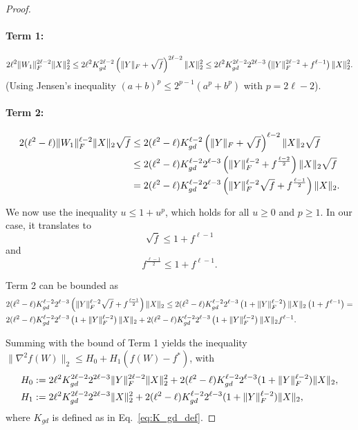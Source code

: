\documentclass[a4paper,11pt]{article}
\DeclarePairedDelimiter{\norm}{\|}{\|}
\newcommand{\1}{\mathbbm{1}}
\theoremstyle{plain}
\begin{document}
\begin{proof}
\paragraph{Term 1:}
\begin{align*}
2\ell^2 \norm{W_1}_F^{2\ell-2} \norm{X}_2^2
\le 2\ell^2 K_{gd}^{2\ell-2} \left( \norm{Y}_F + \sqrt{f} \right)^{2\ell-2} \norm{X}_2^2 
\le 2\ell^2 K_{gd}^{2\ell-2} 2^{2\ell-3} \left( \norm{Y}_F^{2\ell-2} + f^{\ell-1} \right) \norm{X}_2^2.
\end{align*}
(Using Jensen's inequality $(a+b)^p \le 2^{p-1}(a^p+b^p)$ with $p=2\ell-2$).

\paragraph{Term 2:}
\begin{align*}
2(\ell^2-\ell) \norm{W_1}_F^{\ell-2} \norm{X}_2 \sqrt{f}
&\le 2(\ell^2-\ell) K_{gd}^{\ell-2} \left( \norm{Y}_F + \sqrt{f} \right)^{\ell-2} \norm{X}_2 \sqrt{f} \\
&\le 2(\ell^2-\ell) K_{gd}^{\ell-2} 2^{\ell-3} \left( \norm{Y}_F^{\ell-2} + f^{\frac{\ell-2}{2}} \right) \norm{X}_2 \sqrt{f} \\
&= 2(\ell^2-\ell) K_{gd}^{\ell-2} 2^{\ell-3} \left( \norm{Y}_F^{\ell-2}\sqrt{f} + f^{\frac{\ell-1}{2}} \right) \norm{X}_2.
\end{align*}


We now use the inequality $u \leq 1+ u^p$, which holds for all $u \geq 0$ and $p \geq 1$. In our case, it translates to 
\begin{equation*}
    \sqrt{f} \leq 1+f^{\ell-1}
\end{equation*}
and
\begin{equation*}
    f^{\frac{\ell-1}{2}} \leq 1 + f^{\ell-1}.
\end{equation*}

Term 2 can be bounded as
\begin{align*}
    & 2(\ell^2-\ell) K_{gd}^{\ell-2} 2^{\ell-3} \left( \norm{Y}_F^{\ell-2}\sqrt{f} + f^{\frac{\ell-1}{2}} \right) \norm{X}_2 \leq 2(\ell^2-\ell) K_{gd}^{\ell-2} 2^{\ell-3} \left(1+\|Y\|_F^{\ell-2} \right) \|X\|_2 \left(1 + f^{\ell-1} \right) = \\ & 2(\ell^2-\ell) K_{gd}^{\ell-2} 2^{\ell-3} \left(1+\|Y\|_F^{\ell-2} \right) \|X\|_2 + 2(\ell^2-\ell) K_{gd}^{\ell-2} 2^{\ell-3} \left(1+\|Y\|_F^{\ell-2} \right) \|X\|_2 f^{\ell-1}.
\end{align*}

Summing with the bound of Term 1 yields the inequality $\|\nabla^2 f(W)\|_2 \leq H_0 + H_1 (f(W)-f^*)$, with
\begin{align}
\label{eq:H01-post-final}
H_0 &:= 2\ell^2 K_{gd}^{2\ell-2} 2^{2\ell-3} \norm{Y}_F^{2\ell-2} \norm{X}_2^2 + 2(\ell^2-\ell) K_{gd}^{\ell-2} 2^{\ell-3} (1+ \norm{Y}_F^{\ell-2}) \norm{X}_2, \nonumber \\
H_1 &:= 2\ell^2 K_{gd}^{2\ell-2} 2^{2\ell-3} \norm{X}_2^2 + 2(\ell^2-\ell) K_{gd}^{\ell-2} 2^{\ell-3} (1+ \|Y\|_F^{\ell-2}) \norm{X}_2,
\end{align}
where $K_{gd}$ is defined as in Eq.~\eqref{eq:K_gd_def}.





\end{proof}
\end{document}

